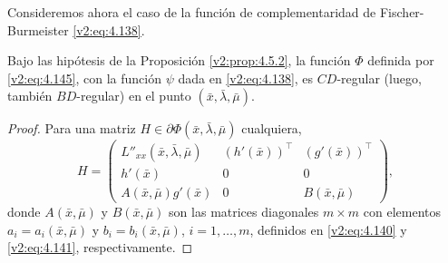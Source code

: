 Consideremos ahora el caso de la función de complementaridad de Fischer-Burmeister \eqref{v2:eq:4.138}.

\begin{proposition}\label{v2:prop:4.5.3}
    Bajo las hipótesis de la Proposición \ref{v2:prop:4.5.2}, la función $\Phi$ definida por \eqref{v2:eq:4.145}, con la función $\psi$ dada en \eqref{v2:eq:4.138}, es $CD$-regular (luego, también $BD$-regular) en el punto $(\bar{x}, \bar{\lambda}, \bar{\mu})$.
\end{proposition}

\begin{proof}
    Para una matriz $H \in \partial \Phi(\bar{x}, \bar{\lambda}, \bar{\mu})$ cualquiera,
    \[
        H = \begin{pmatrix} L''_{xx}(\bar{x}, \bar{\lambda}, \bar{\mu}) & (h'(\bar{x}))^\top & (g'(\bar{x}))^\top \\
        h'(\bar{x}) & 0 & 0 \\
        A(\bar{x}, \bar{\mu})g'(\bar{x}) & 0 & B(\bar{x}, \bar{\mu}) \end{pmatrix},
    \]
    donde $A(\bar{x}, \bar{\mu})$ y $B(\bar{x}, \bar{\mu})$ son las matrices diagonales $m \times m$ con elementos $a_i = a_i(\bar{x}, \bar{\mu})$ y $b_i = b_i(\bar{x}, \bar{\mu})$, $i = 1, \dots, m$, definidos en \eqref{v2:eq:4.140} y \eqref{v2:eq:4.141}, respectivamente.
    

\end{proof}
